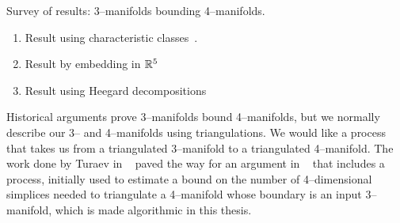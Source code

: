 Survey of results: 3--manifolds bounding 4--manifolds.

\begin{enumerate}
	\item Result using characteristic classes~\cite{MilnStas}.
	\item Result by embedding in $\mathbb{R}^5$~\cite{Hirsch61}~\cite{Rokhlin65}~\cite{Wall65}
	\item Result using Heegard decompositions~\cite{Rourke85}
\end{enumerate}

Historical arguments prove 3--manifolds bound 4--manifolds, but we normally describe our 3-- and 4--manifolds using triangulations.
We would like a process that takes us from a triangulated 3--manifold to a triangulated 4--manifold.
The work done by Turaev in ~\cite{Turaev91} paved the way for an argument in ~\cite{CostThur08} that includes a process, initially used to estimate a bound on the number of 4--dimensional simplices needed to triangulate a 4--manifold whose boundary is an input 3--manifold, which is made algorithmic in this thesis.